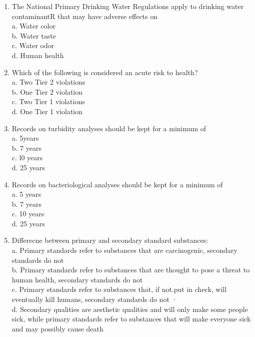\documentclass{article}
\begin{document}
\begin{enumerate}
\item The National Primary Drinking Water Regulations apply to drinking water contaminantR that may have adverse effects on\\
a.	Water color\\
b.	Water taste\\
c.	Water odor\\
d.	Human health\\

\item Which of the following is considered an acute risk to health?\\
a.	Two Tier 2 violations\\
b.	One Tier 2 violation\\
c.	Two Tier 1 violations\\
d.	One Tier 1 violation\\

\item Records on turbidity analyses should be kept for a minimum of\\
a.	5years\\
b.	7 years\\
c.	l0 years\\
d.	25 years\\

\item Records on bacteriological analyses should be kept for a minimum of\\
a.	5 years\\
b.	7 years\\
c.	10 years\\
d.	25 years\\

\item Differecne between primary and secondary standard substances:\\
a.	Primary standards refer to substances that are carcinogenic, secondary standards do not\\
b.	Primary standards refer to substances that are thought to pose a threat to human health, secondary standards do not\\
c.	Primary standards refer to substances that, if not.put in check, will eventually kill humans, secondary standards do not	·\\
d.	Secondary qualities are aesthetic qualities and will only make some people sick, while primary standards refer to substances that will make everyone sick and may possibly cause death\\


\end{enumerate}
\end{document}

